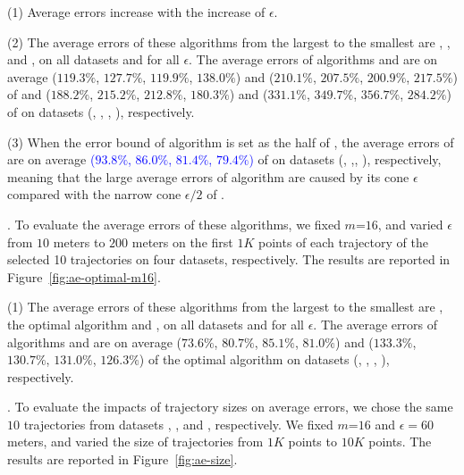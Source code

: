 \ni(1) Average errors increase with the increase of $\epsilon$.

\ni(2) The average errors of these algorithms from the largest to the smallest are \cista, \cist, \dps and \squishe, on all datasets and for all $\epsilon$.
The average errors of algorithms \cist and \cista are on average
($119.3\%$, $127.7\%$, $119.9\%$, $138.0\%$)
and ($210.1\%$, $207.5\%$, $200.9\%$, $217.5\%$)
of \dps and ($188.2\%$, $215.2\%$, $212.8\%$, $180.3\%$) and 
($331.1\%$, $349.7\%$, $356.7\%$, $284.2\%$)
 of \squishe on {datasets} (\sercar, \geolife, \mopsi, \pricar), respectively.

\ni(3) When the error bound of algorithm \cista is set as the half of \cist, the
average errors of \cista are on average \textcolor{blue}{($93.8\%$, $86.0\%$, $81.4\%$, {$79.4\%$})} of \cist on {datasets} (\sercar, \geolife,\mopsi, \pricar), respectively, meaning that the large average errors of algorithm \cista are caused by its cone \wrt $\epsilon$ compared with the narrow cone \wrt $\epsilon/2$ of \cist.

.
To evaluate the average errors of these algorithms, we fixed {$m$=$16$}, and
varied $\epsilon$ from $10$ meters to $200$ meters on the first $1K$ points of each trajectory of the selected 10 trajectories on four datasets, respectively. 
The results are reported in Figure~\ref{fig:ae-optimal-m16}.

\ni(1) The average errors of these algorithms from the largest to the smallest are \cista, the optimal algorithm and \cist, on all datasets and for all $\epsilon$.
The average errors of algorithms \cist and \cista are on average
($73.6\%$, $80.7\%$, $85.1\%$, $81.0\%$)
and ($133.3\%$, $130.7\%$, $131.0\%$, $126.3\%$)
of the optimal algorithm on {datasets} (\sercar, \geolife, \mopsi, \pricar), respectively.

.
To evaluate the impacts of trajectory sizes on average errors, we chose the same
{$10$} trajectories from  {datasets}  \sercar, \geolife, \mopsi and \pricar, respectively.
We fixed {$m$=$16$} and $\epsilon = 60$ meters, and varied the size  of trajectories from $1K$ points to $10K$ points.
%
The results are reported in Figure~\ref{fig:ae-size}.

